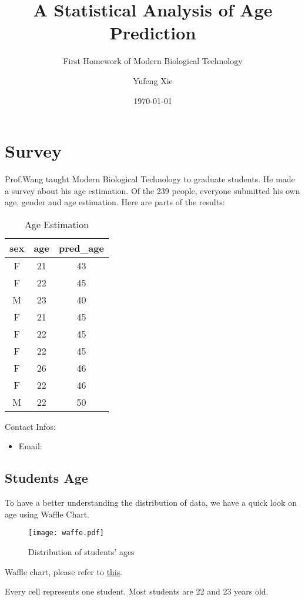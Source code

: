 \documentclass[fancy,11pt,twocol]{elegantbook}
\title{A Statistical Analysis of Age Prediction}
\subtitle{First Homework of Modern Biological Technology}
\author{Yufeng Xie}
\institute{School of Life Sciences, Tsinghua University}
\date{\today}
\begin{document}
\maketitle
\tableofcontents
\clearpage
\thispagestyle{empty}
\mainmatter
\hypersetup{pageanchor=true}

\chapter{Survey}
Prof.Wang taught Modern Biological Technology to graduate students. He made a survey about his age estimation. 
Of the 239 people, everyone submitted his own age, gender and age estimation.
Here are parts of the results:
\begin{table}[htbp]
	\centering
	\caption{Age Estimation}
	  \begin{tabular}{ccc}
	  \toprule
	  sex   & age   & pred\_age \\
	  \midrule
	  F     & 21    & 43 \\
	  F     & 22    & 45 \\
	  M     & 23    & 40 \\
	  F     & 21    & 45 \\
	  F     & 22    & 45 \\
	  F     & 22    & 45 \\
	  F     & 26    & 46 \\
	  F     & 22    & 46 \\
	  M     & 22    & 50 \\
	  \bottomrule
	  \end{tabular}%
	\label{tab:addlabel}%
  \end{table}%
  

Contact Infos:
\begin{itemize}
	\item Email: 
\end{itemize}


\section{Students Age}
To have a better understanding the distribution of data, we have a quick look on age using Waffle Chart.
\begin{figure}[htbp]
	\centering
	\texttt{[image: waffe.pdf]}
	\caption{Distribution of students' ages}
\end{figure}


\begin{note}
	Waffle chart, please refer to \href{https://en.wikipedia.org/wiki/Pie_chart#Square_chart_/_Waffle_chart}{this}.
\end{note}
Every cell represents one student. Most students are 22 and 23 years old.
\end{document}
